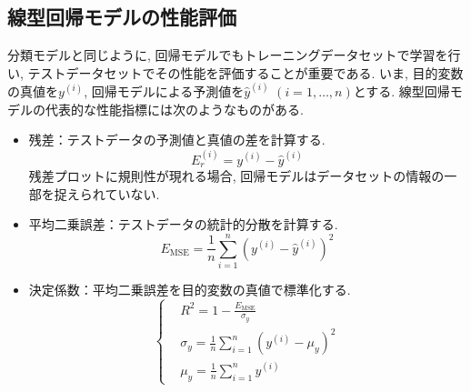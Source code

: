 \documentclass[uplatex]{jsarticle}
\theoremstyle{definition}
\numberwithin{equation}{section}
\begin{document}
\subsection{線型回帰モデルの性能評価}
分類モデルと同じように, 回帰モデルでもトレーニングデータセットで学習を行い, テストデータセットでその性能を評価することが重要である.
いま, 目的変数の真値を$y^{(i)}$, 回帰モデルによる予測値を$\hat{y}^{(i)}$ $(i = 1, \dots, n)$とする.
線型回帰モデルの代表的な性能指標には次のようなものがある.
\begin{itemize}
    \item
    残差：テストデータの予測値と真値の差を計算する.
    \begin{equation}
        E_{r}^{(i)} = y^{(i)} - \hat{y}^{(i)}
    \end{equation}
    残差プロットに規則性が現れる場合, 回帰モデルはデータセットの情報の一部を捉えられていない.

    \item
    平均二乗誤差：テストデータの統計的分散を計算する.
    \begin{equation}
        E_{\mathrm{MSE}} = \frac{1}{n}\sum_{i = 1}^{n} (y^{(i)} - \hat{y}^{(i)})^{2}
    \end{equation}

    \item
    決定係数：平均二乗誤差を目的変数の真値で標準化する.
    \begin{equation}
        \left\{
        \begin{aligned}
            &R^{2} = 1 - \frac{E_{\mathrm{MSE}}}{\sigma_{y}} \\
            &\sigma_{y} = \frac{1}{n}\sum_{i = 1}^{n} (y^{(i)} - \mu_{y})^{2} \\
            &\mu_{y} = \frac{1}{n}\sum_{i = 1}^{n} y^{(i)}
        \end{aligned}
        \right.
    \end{equation}
\end{itemize}
\end{document}
